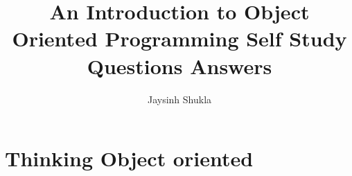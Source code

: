 \documentclass{article}
\author{Jaysinh Shukla}
\title{An Introduction to Object Oriented Programming Self Study Questions Answers}
\begin{document}
  \maketitle

  \chapter{Thinking Object oriented}
  
\end{document}
